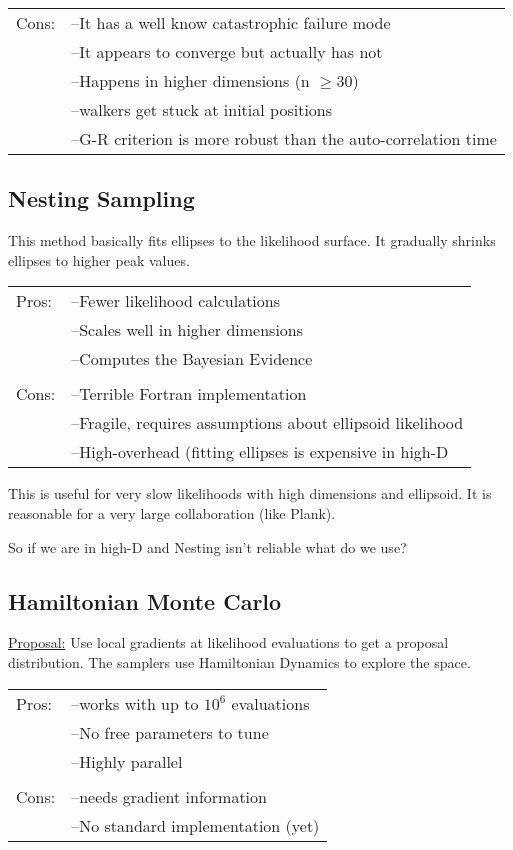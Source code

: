 \documentclass{article}
\begin{document}
\begin{tabular}{r l}
Cons:  & --It has a well know catastrophic failure mode \\
& --It appears to converge but actually has not \\
& --Happens in higher dimensions (n $\geq$30) \\
& --walkers get stuck at initial positions \\
& --G-R criterion is more robust than the auto-correlation time\\
\end{tabular}

\subsection{Nesting Sampling}

This method basically fits ellipses to the likelihood surface.  It gradually shrinks ellipses to higher peak values.

\begin{tabular}{l l}

Pros: & --Fewer likelihood calculations \\
& --Scales well in higher dimensions \\
& --Computes the Bayesian Evidence \\
 &  \\
Cons: & --Terrible Fortran implementation \\
& --Fragile, requires assumptions about ellipsoid likelihood \\
& --High-overhead (fitting ellipses is expensive in high-D \\

\end{tabular}


This is useful for very slow likelihoods with high dimensions and ellipsoid.  It is reasonable for a very large collaboration (like Plank).

So if we are in high-D and Nesting isn't reliable what do we use?

\subsection{Hamiltonian Monte Carlo}

\underline{Proposal:}  Use local gradients at likelihood evaluations to get a proposal distribution.  The samplers use Hamiltonian Dynamics to explore the space.


\begin{tabular}{l l}

Pros: & --works with up to $10^6$ evaluations \\
& --No free parameters to tune \\
& --Highly parallel \\
 & \\
Cons: & --needs gradient information \\
& --No standard implementation (yet)

\end{tabular}
\end{document}
